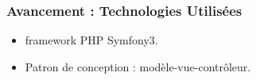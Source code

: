 \speaker{\Kafui}
\begin{frame}
  \frametitle{Avancement : Technologies Utilisées}
  \begin{itemize}
    \item framework PHP Symfony3.
    \item Patron de conception : modèle-vue-contrôleur.
  \end{itemize}
\end{frame}
